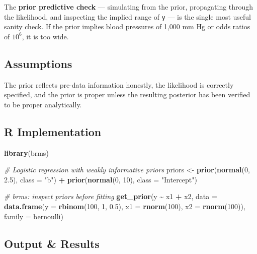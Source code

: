 \documentclass[
]{article}
\newenvironment{Shaded}{\begin{snugshade}}{\end{snugshade}}
\newcommand{\AttributeTok}[1]{\textcolor[rgb]{0.13,0.29,0.53}{#1}}
\newcommand{\CommentTok}[1]{\textcolor[rgb]{0.56,0.35,0.01}{\textit{#1}}}
\newcommand{\DecValTok}[1]{\textcolor[rgb]{0.00,0.00,0.81}{#1}}
\newcommand{\FloatTok}[1]{\textcolor[rgb]{0.00,0.00,0.81}{#1}}
\newcommand{\FunctionTok}[1]{\textcolor[rgb]{0.13,0.29,0.53}{\textbf{#1}}}
\newcommand{\NormalTok}[1]{#1}
\newcommand{\OtherTok}[1]{\textcolor[rgb]{0.56,0.35,0.01}{#1}}
\newcommand{\SpecialCharTok}[1]{\textcolor[rgb]{0.81,0.36,0.00}{\textbf{#1}}}
\newcommand{\StringTok}[1]{\textcolor[rgb]{0.31,0.60,0.02}{#1}}
\begin{document}
The \textbf{prior predictive check} --- simulating from the prior,
propagating through the likelihood, and inspecting the implied range of
\texttt{y} --- is the single most useful sanity check. If the prior
implies blood pressures of 1,000 mm Hg or odds ratios of \(10^6\), it is
too wide.

\subsection{Assumptions}\label{assumptions}

The prior reflects pre-data information honestly, the likelihood is
correctly specified, and the prior is proper unless the resulting
posterior has been verified to be proper analytically.

\subsection{R Implementation}\label{r-implementation}

\begin{Shaded}
\begin{Highlighting}[]
\FunctionTok{library}\NormalTok{(brms)}

\CommentTok{\# Logistic regression with weakly informative priors}
\NormalTok{priors }\OtherTok{\textless{}{-}} \FunctionTok{prior}\NormalTok{(}\FunctionTok{normal}\NormalTok{(}\DecValTok{0}\NormalTok{, }\FloatTok{2.5}\NormalTok{), }\AttributeTok{class =} \StringTok{"b"}\NormalTok{) }\SpecialCharTok{+}
          \FunctionTok{prior}\NormalTok{(}\FunctionTok{normal}\NormalTok{(}\DecValTok{0}\NormalTok{, }\DecValTok{10}\NormalTok{),  }\AttributeTok{class =} \StringTok{"Intercept"}\NormalTok{)}

\CommentTok{\# brms: inspect priors before fitting}
\FunctionTok{get\_prior}\NormalTok{(y }\SpecialCharTok{\textasciitilde{}}\NormalTok{ x1 }\SpecialCharTok{+}\NormalTok{ x2, }\AttributeTok{data =} \FunctionTok{data.frame}\NormalTok{(}\AttributeTok{y =} \FunctionTok{rbinom}\NormalTok{(}\DecValTok{100}\NormalTok{, }\DecValTok{1}\NormalTok{, }\FloatTok{0.5}\NormalTok{),}
                                          \AttributeTok{x1 =} \FunctionTok{rnorm}\NormalTok{(}\DecValTok{100}\NormalTok{), }\AttributeTok{x2 =} \FunctionTok{rnorm}\NormalTok{(}\DecValTok{100}\NormalTok{)),}
          \AttributeTok{family =}\NormalTok{ bernoulli)}
\end{Highlighting}
\end{Shaded}

\subsection{Output \& Results}\label{output-results}
\end{document}
